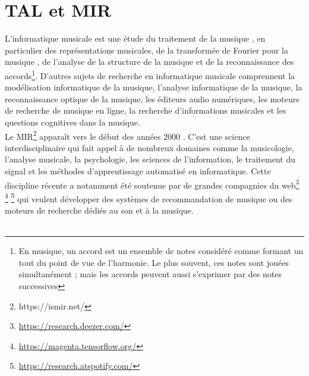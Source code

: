 \section{TAL et MIR}
L'informatique musicale \cite{mus_inf} est une étude du traitement de la
musique \cite{book_muller}, 
en particulier des représentations musicales, de la
transformée de Fourier pour la musique \cite{fourier}, de l'analyse de la
structure de la musique et de la reconnaissance des accords\footnote{En
musique, un accord est un ensemble de notes considéré comme formant un tout du
point de vue de l'harmonie. Le plus souvent, ces notes sont jouées
simultanément ; mais les accords peuvent aussi s'exprimer par des notes
successives}. 
D'autres sujets de recherche en informatique musicale comprennent
la modélisation informatique de la musique, l'analyse informatique de la
musique, la reconnaissance optique de la musique, les éditeurs audio
numériques, les moteurs de recherche de musique en ligne, la recherche
d'informations musicales et les questions cognitives 
dans la musique.\\
Le MIR\footnote{https://ismir.net/} apparaît vers le début des années 2000
\cite{MIR_1}. 
C’est une science interdisciplinaire qui fait appel à de nombreux
domaines comme la musicologie, l’analyse musicale, la psychologie, les sciences
de l’information, le traitement du signal et les méthodes d’apprentissage
automatisé en informatique. Cette discipline récente a notamment été soutenue
par de grandes compagnies du web\footnote{\url{https://research.deezer.com/}}
\footnote{\url{https://magenta.tensorflow.org/}}
\footnote{\url{https://research.atspotify.com/}} qui veulent développer des
systèmes de recommandation de musique ou des moteurs de recherche dédiés au son
et à la musique.\\\\
